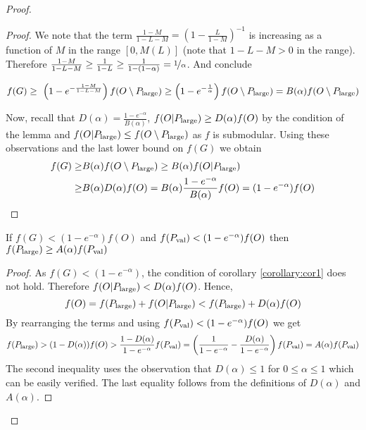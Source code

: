 \begin{proof}
\begin{proof}
  	We note that the term $\frac{1-M}{1-L-M} = \left(  1- \frac{L}{1-M} \right)^{-1}$ is increasing as a function
  	of $M$  in the range $[0, M(L)]$ (note that $1-L-M >0$ in the range).
  	Therefore $\frac{1-M}{1-L-M} \geq  \frac{1 }{1-L}  \geq \frac{1}{1-(1-\alpha)} = \nicefrac[]{1}{\alpha}$. And conclude
  		
  	  $$f(G)
  	\geq \ \left(1-e^{- \frac{1-M }{1-L-M}}\right) f(O\setminus P_{\text{large}}) \geq \left( 1- e ^ {- \frac{1}{ \alpha}} \right)f(O\setminus P_{\text{large}})
  	= B(\alpha)f(O\setminus P_{\text{large}}) $$
  	
  	Now, recall that $D(\alpha)= \frac{1-e^{-\alpha}}{B(\alpha)}$,
	$f(O|P_{\text{large}}) \geq D(\alpha) f(O)$ by the condition of the
	lemma and $f(O|P_{\text{large}}) \leq f(O\setminus P_{\text{large}})$ as
	$f$ is submodular. Using these observations and the last lower
	bound on $f(G)$ we obtain
\begin{align*}
f(G) \geq& B(\alpha)f(O\setminus P_{\text{large}})  \geq
B(\alpha) f(O|P_{\text{large}})\\  \geq&
B(\alpha ) D(\alpha ) f(O)
= B(\alpha)\frac{1-e^{-\alpha}}{B(\alpha) }f(O)= (1-e^{-\alpha})f(O)
\end{align*}

	\end{proof}

	\begin{corollary}
		\label{corollary:cor2}
		If $f(G)< (1-e^{-\alpha})f(O)$ and $f(P_{\text{val}}) < (1-e^{-\alpha})f(O)$ then
		$f(P_{\text{large}}) \geq A(\alpha) f(P_{\text{val}})$
		\end{corollary}
	\begin{proof}
		As $f(G)< (1-e^{-\alpha})$, the condition of corollary \ref{corollary:cor1} does not hold. Therefore
		$f(O|P_{\text{large}})< D(\alpha) f(O)$. Hence,
		$$f(O)= f(P_{\text{large}}) + f(O|P_{\text{large}}) < f(P_{\text{large}}) + D(\alpha) f(O)$$
		By rearranging the terms and using $f(P_{\text{val}}) < (1-e^{-\alpha})f(O)$
		we get
		$$f(P_{\text{large}}) > (1-D(\alpha)) f(O) > \frac{1-D(\alpha)}{1-e^{-\alpha}} f(P_{\text{val}})
		= \left(\frac{1}{1-e^{-\alpha}} - \frac{D(\alpha)}{1-e^{-\alpha}}\right) f(P_{\text{val}}) = A(\alpha) f(P_{\text{val}})$$
		The second inequality uses the observation that $D(\alpha) \leq 1$ for $0\leq \alpha \leq 1$ which can be easily verified. The last equality follows from the definitions
		of $D(\alpha)$ and $A(\alpha)$.
		

\end{proof}
\end{proof}
